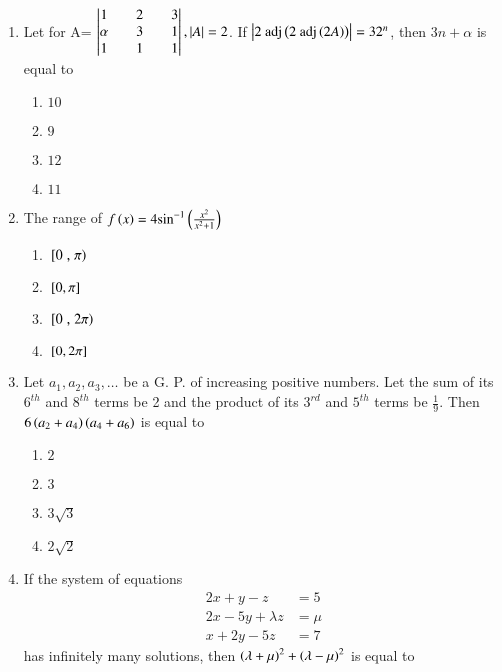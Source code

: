 \documentclass[journal]{IEEEtran}
\theoremstyle{remark}
\begin{document}
\begin{enumerate}
\item Let for A= $\begin{vmatrix} 1&&2&&3\\\alpha&&3 &&1\\1&&1&&1\end{vmatrix} , \left\vert A\right\vert=2$. If
$\left\vert2\text{ adj}\left(2\text{ adj}\left(2A\right)\right)\right\vert=32^n$, then $3n+\alpha$ is equal to\hfill{}
\begin{multicols}{4}
\begin{enumerate}
\item $10$
\item $9$
\item $12$
\item $11$
\end{enumerate}
\end{multicols}

\item The range of $f\left(x\right)=4{\sin}^{-1}\left(\frac{x^2}{x^2+1}\right)$\hfill{}

\begin{multicols}{4}
\begin{enumerate}
\item ${}\left[0\right.,\left.\pi\right)$
\item ${}\left[0,\pi\right]$
\item ${}\left[0\right.,\left.2\pi\right)$
\item ${}\left[0,2\pi\right]$
\end{enumerate}
\end{multicols}

\item Let $a_1, a_2, a_3, \dots$ be a G. P. of increasing positive numbers. Let the sum of its $6^{th}$ and $8^{th}$ terms be 2 and the product of its $3^{rd}$ and $5^{th}$ terms be $\frac{1}{9}$. Then $6\left(a_2 + a_4\right)\left( a_4 + a_6\right)$ is equal to\hfill{}

\begin{multicols}{4}
\begin{enumerate}
\item $2$
\item $3$
\item $3\sqrt{3}$
\item $2\sqrt{2}$
\end{enumerate}
\end{multicols}

\item If the system of equations
\begin{align*}
2x+y -z&=5\\
2x-5y+\lambda z&=\mu\\
x+2y-5z&=7
\end{align*}
has infinitely many solutions, then ${\left(\lambda+\mu\right)}^2+{\left(\lambda-\mu\right)}^2$ is equal to


\end{enumerate}
\end{document}
